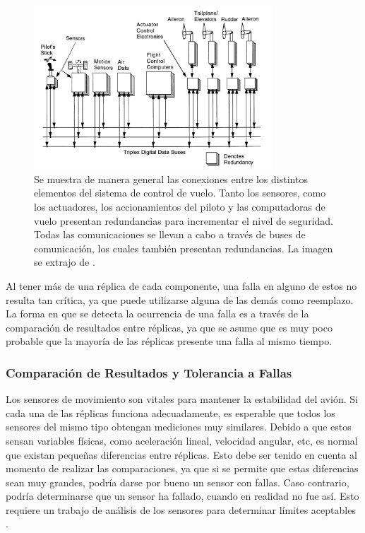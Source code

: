\begin{figure}[htb]
    \centering
    \includegraphics[width=0.8\textwidth]{img/diagrama_general_fly_by_wire.png}
    \caption{Se muestra de manera general las conexiones entre los distintos elementos del sistema de control de vuelo. Tanto los sensores, como los actuadores, los accionamientos del piloto y las computadoras de vuelo presentan redundancias para incrementar el nivel de seguridad. Todas las comunicaciones se llevan a cabo a través de buses de comunicación, los cuales también presentan redundancias. La imagen se extrajo de \cite{collinson2023introduction}.}
    \label{fig:diagrama_general_fly_by_wire}    
\end{figure}

Al tener más de una réplica de cada componente, una falla en alguno de estos no resulta tan crítica, ya que puede utilizarse alguna de las demás como reemplazo. La forma en que se detecta la ocurrencia de una falla es a través de la comparación de resultados entre réplicas, ya que se asume que es muy poco probable que la mayoría de las réplicas presente una falla al mismo tiempo.

\subsubsection{Comparación de Resultados y Tolerancia a Fallas}

Los sensores de movimiento son vitales para mantener la estabilidad del avión. Si cada una de las réplicas funciona adecuadamente, es esperable que todos los sensores del mismo tipo obtengan mediciones muy similares. %
Debido a que estos sensan variables físicas, como aceleración lineal, velocidad angular, etc, es normal que existan pequeñas diferencias entre réplicas. Esto debe ser tenido en cuenta al momento de realizar las comparaciones, ya que si se permite que estas diferencias sean muy grandes, podría darse por bueno un sensor con fallas. Caso contrario, podría determinarse que un sensor ha fallado, cuando en realidad no fue así. Esto requiere un trabajo de análisis de los sensores para determinar límites aceptables \cite{lala1994architectural}.

